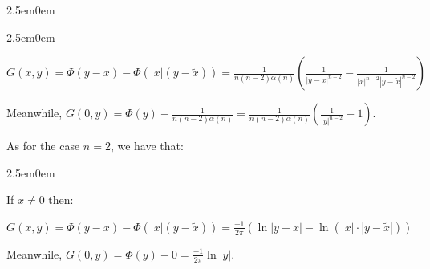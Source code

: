 \documentclass{book}
\newcommand{\exPPP}{%
   \color{VioletRed}%
   \fontsize{12}{14}\selectfont%
}
\newenvironment{myIndent}{%
   \begin{adjustwidth}{2.5em}{0em}%
}{%
   \end{adjustwidth}%
}
\newcommand{\retTwo}{\hfill\bigbreak}
\begin{document}
\begin{myIndent}
\begin{myIndent}
		{\centering$G(x, y) = \Phi(y - x) - \Phi(|x|(y - \widetilde{x})) = \frac{1}{n(n - 2)\alpha(n)}\left(\frac{1}{|y - x|^{n-2}} - \frac{1}{|x|^{n-2}|y - \widetilde{x}|^{n-2}}\right)$\retTwo\par}

		Meanwhile, $G(0, y) = \Phi(y) - \frac{1}{n(n - 2)\alpha(n)} = \frac{1}{n(n - 2)\alpha(n)}\left(\frac{1}{|y|^{n-2}} - 1\right)$.\retTwo
	\end{myIndent}

	As for the case $n = 2$, we have that:
	\begin{myIndent}\exPPP
		If $x \neq 0$ then:
		
		{\centering$G(x, y) = \Phi(y - x) - \Phi(|x|(y - \widetilde{x})) = \frac{-1}{2\pi}\left(\ln|y - x| - \ln(|x| \cdot |y - \widetilde{x}|)\right)$\retTwo\par}

		Meanwhile, $G(0, y) = \Phi(y) - 0 = \frac{-1}{2\pi}\ln|y|$.\retTwo
	\end{myIndent}
\end{myIndent}
\end{document}
